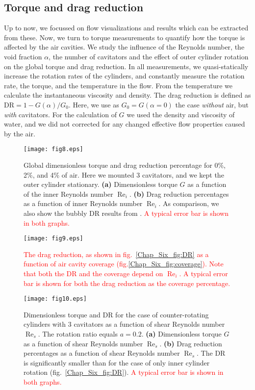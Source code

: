 \documentclass[aps,onecolumn,10pt, floatfix, superscriptaddress,longbibliography, pra]{revtex4-1}
\newcommand{\red}[1]{\textcolor{red}{#1}}
\renewcommand{\Re}{\operatorname{Re}}
\begin{document}
\subsection{Torque and drag reduction}
\label{sec:torque}
Up to now, we focussed on flow visualizations and results which can be extracted from these. Now, we turn to torque measurements to quantify how the torque is affected by the air cavities. We study the influence of the Reynolds number, the void fraction $\alpha$, the number of cavitators and the effect of outer cylinder rotation on the global torque and drag reduction. In all measurements, we quasi-statically increase the rotation rates of the cylinders, and constantly measure the rotation rate, the torque, and the temperature in the flow. From the temperature we calculate the instantaneous viscosity and density.
The drag reduction is defined as $\text{DR} = 1 - G(\alpha) / G_{0}$. Here, we use as $G_{0}=G(\alpha=0)$ the case {\it without} air, but {\it with} cavitators. For the calculation of $G$ we used the density and viscosity of water, and we did not corrected for any changed effective flow properties caused by the air.

\begin{figure}[htp]
\centering
\texttt{[image: fig8.eps]}
\caption{Global dimensionless torque and drag reduction percentage for 0\%, 2\%, and 4\% of air. Here we mounted 3 cavitators, and we kept the outer cylinder stationary. {\bf (a)} Dimensionless torque $G$ as a function of the inner Reynolds number $\Re_i$.  {\bf (b)} Drag reduction percentages as a function of inner Reynolds number $\Re_i$. As comparison, we also show the bubbly DR results from \citet{gil13}. \red{A typical error bar is shown in both graphs.}}
\label{Chap_Six_fig:DR}
\texttt{[image: fig9.eps]}
\caption{\red{The drag reduction, as shown in fig.\ \ref{Chap_Six_fig:DR} as a function of air cavity coverage (fig.\ref{Chap_Six_fig:coverage}). Note that both the DR and the coverage depend on $\Re_i$. A typical error bar is shown for both the drag reduction as the coverage percentage.  }}
\label{Chap_Six_fig:DR_coverage}

\texttt{[image: fig10.eps]}
\caption{Dimensionless torque and DR for the case of counter-rotating cylinders with 3 cavitators as a function of shear Reynolds number $\Re_s$. The rotation ratio equals $a=0.2$. 
{\bf (a)} Dimensionless torque $G$ as a function of shear Reynolds number $\Re_s$.  {\bf (b)} Drag reduction percentages as a function of shear Reynolds number $\Re_s$. The DR is significantly smaller than for the case of only inner cylinder rotation (fig.\ \ref{Chap_Six_fig:DR}). \red{A typical error bar is shown in both graphs.} }
\label{Chap_Six_fig:DR_CR}
\end{figure} 
\end{document}
